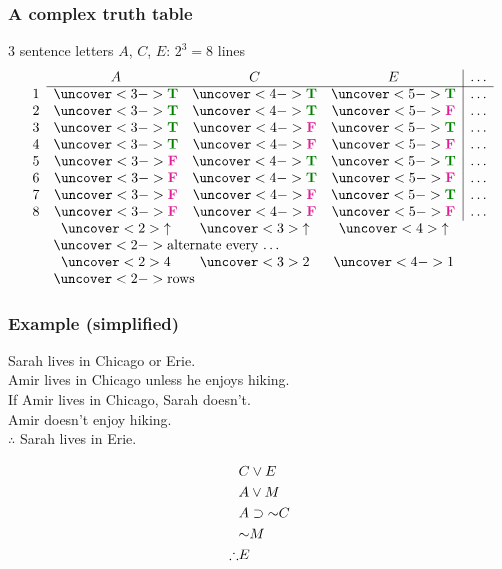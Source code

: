 \begin{frame}
  \frametitle{A complex truth table}
  
  3 sentence letters $A$, $C$, $E$: $2^3 = 8$ lines
  \footnotesize
    \[\begin{array}{lccc|c}
    & A & C & E & \dots\\
     \cline{2-5}
    1 & \uncover<3->{\True} & \uncover<4->{\True} &
     \uncover<5->{\True} & \dots \\
    2 & \uncover<3->{\True} & \uncover<4->{\True} &
     \uncover<5->{\False} & \dots \\
    3 & \uncover<3->{\True} & \uncover<4->{\False} &
     \uncover<5->{\True} & \dots \\
    4 & \uncover<3->{\True} & \uncover<4->{\False} &
     \uncover<5->{\False} & \dots \\
    5 & \uncover<3->{\False} & \uncover<4->{\True} &
    \uncover<5->{\True} & \dots \\
    6 & \uncover<3->{\False} & \uncover<4->{\True} &
    \uncover<5->{\False} & \dots \\
    7 & \uncover<3->{\False} & \uncover<4->{\False} &
    \uncover<5->{\True} & \dots \\
    8 & \uncover<3->{\False} & \uncover<4->{\False} &
    \uncover<5->{\False} & \dots \\
    & \uncover<2>{\uparrow} &\uncover<3>{\uparrow} & \multicolumn{1}{c}{\uncover<4>{\uparrow}}\\
    & \multicolumn{4}{l}{\uncover<2->{\text{alternate every \dots}}} \\
    & \uncover<2>{4} & \uncover<3>{2} & \multicolumn{1}{c}{\uncover<4->{1}} \\
    & \multicolumn{4}{l}{\uncover<2->{\text{rows}}} \\
    \end{array}\]
  \end{frame}
  
\begin{frame}
  \frametitle{Example (simplified)}

  Sarah lives in Chicago or Erie.\\
  Amir lives in Chicago unless he enjoys hiking.\\
  If Amir lives in Chicago, Sarah doesn't.\\
  Amir doesn't enjoy hiking.\\
  $\therefore$ Sarah lives in Erie.

  \begin{align*}
  & C \eor E\\
  & A \eor M\\
  & A \eif \enot C\\
  &\enot M\\
  \therefore & E
  \end{align*}
\end{frame}

